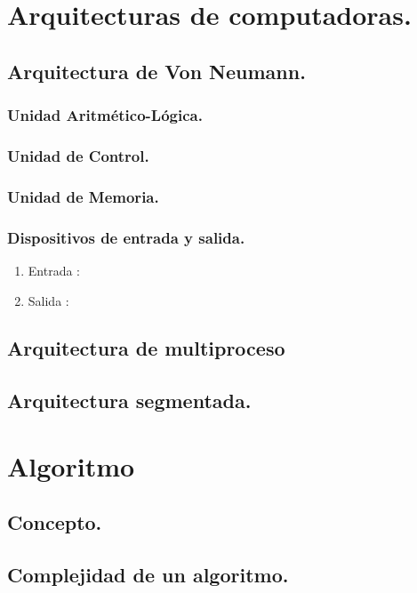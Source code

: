 \documentclass{book} %
\begin{document}
\chapter{Arquitecturas de computadoras.}
\section{Arquitectura de Von Neumann.}

\subsection{Unidad Aritmético-Lógica.}

\subsection{Unidad de Control.}

\subsection{Unidad de Memoria.}

\subsection{Dispositivos de entrada y salida.}
\begin{enumerate}
	\item Entrada :
	\item Salida :
\end{enumerate}

\section{Arquitectura de multiproceso}

\section{Arquitectura segmentada.}

\chapter{Algoritmo}
\section{Concepto.}

\section{Complejidad de un algoritmo.}
\end{document}

